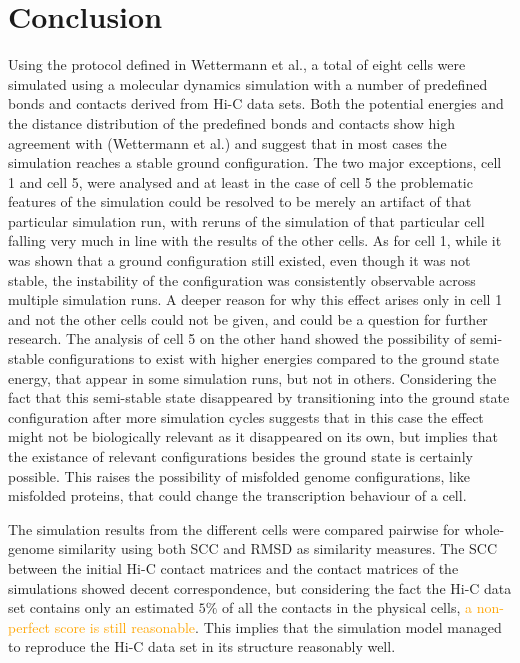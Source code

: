 
\chapter{Conclusion} %
\label{cha:conclusion}

Using the protocol defined in Wettermann et al.\cite{wettermann_minimal_2020}, a total of eight cells were simulated using a molecular dynamics simulation with a number of predefined bonds and contacts derived from Hi-C data sets. Both the potential energies and the distance distribution of the predefined bonds and contacts show high agreement with (Wettermann et al.\cite{wettermann_minimal_2020}) and suggest that in most cases the simulation reaches a stable ground configuration. The two major exceptions, cell 1 and cell 5, were analysed and at least in the case of cell 5 the problematic features of the simulation could be resolved to be merely an artifact of that particular simulation run, with reruns of the simulation of that particular cell falling very much in line with the results of the other cells. As for cell 1, while it was shown that a ground configuration still existed, even though it was not stable, the instability of the configuration was consistently observable across multiple simulation runs. A deeper reason for why this effect arises only in cell 1 and not the other cells could not be given, and could be a question for further research. The analysis of cell 5 on the other hand showed the possibility of semi-stable configurations to exist with higher energies compared to the ground state energy, that appear in some simulation runs, but not in others. Considering the fact that this semi-stable state disappeared by transitioning into the ground state configuration after more simulation cycles suggests that in this case the effect might not be biologically relevant as it disappeared on its own, but implies that the existance of relevant configurations besides the ground state is certainly possible. This raises the possibility of misfolded genome configurations, like misfolded proteins, that could change the transcription behaviour of a cell.

The simulation results from the different cells were compared pairwise for whole-genome similarity using both SCC and RMSD as similarity measures. The SCC between the initial Hi-C contact matrices and the contact matrices of the simulations showed decent correspondence, but considering the fact the Hi-C data set contains only an estimated \(5\%\) of all the contacts in the physical cells, \textcolor{orange}{a non-perfect score is still reasonable}. This implies that the simulation model managed to reproduce the Hi-C data set in its structure reasonably well.

